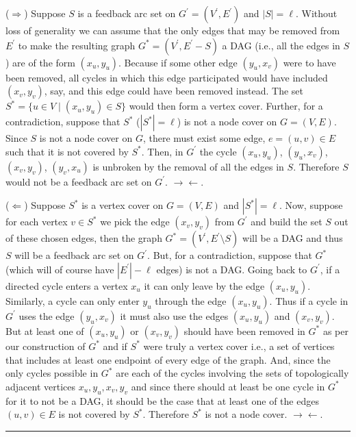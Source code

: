 \documentclass{article}
\newenvironment{proof}{{\bf Proof:}}{\hfill\rule{2mm}{2mm}}
\begin{document}
\begin{proof}

($\Rightarrow$) Suppose $S$ is a feedback arc set on $G^\prime = (V^\prime,E^\prime)$ and $|S|=\ell$. Without loss of generality we can assume
that the only edges that may be removed from $E^\prime$ to make the resulting graph $G^* = (V^\prime,E^\prime-S)$ a DAG (i.e., all the edges in $S$) are of the form $(x_u, y_u)$. Because if some other edge $(y_u, x_v)$ were to have been removed, all cycles in which this edge participated would have included $(x_v,y_v)$, say, and this edge could have been removed instead. The set $S^* = \{u \in V\;|\;(x_u,y_u) \in S\}$ would then form a vertex cover. Further, for a contradiction, suppose that $S^*$ ($|S^*|=\ell$) is not a node cover on $G = (V,E)$. Since $S$ is not a node cover on $G$, there must exist some edge, $e=(u,v)\in E$ such that it is not covered by $S^*$. Then, in $G^\prime$ the cycle $(x_u, y_u)$, $(y_u, x_v)$, $(x_v, y_v)$, $(y_v, x_u)$ is unbroken
by the removal of all the edges in $S$. Therefore $S$ would not be a feedback arc set on $G^\prime$. $\rightarrow \leftarrow$.

($\Leftarrow$) Suppose $S^*$ is a vertex cover on $G = (V,E)$ and $|S^*|=\ell$. Now, suppose for each vertex $v\in S^*$ we pick the edge $(x_v,y_v)$ from $G^\prime$ and build the set $S$ out of these chosen edges, then the graph $G^* = (V^\prime,E^\prime \setminus S)$ will be a DAG and thus $S$ will be a feedback arc set on $G^\prime$. But, for a contradiction, suppose that $G^*$ (which will of course have $|E^\prime| - \ell$ edges) is not a DAG. Going back to $G^\prime$, if a directed cycle enters a vertex $x_u$ it can only leave by the edge $(x_u, y_u)$. Similarly, a cycle can only enter $y_u$ through the edge $(x_u, y_u)$. Thus if a cycle in $G^\prime$ uses the edge $(y_u, x_v)$ it must also use the edges $(x_u, y_u)$ and $(x_v, y_v)$. But at least one of $(x_u, y_u)$ or $(x_v, y_v)$ should have been removed in $G^*$ as per our construction of $G^*$ and if $S^*$ were truly a vertex cover i.e., a set of vertices that includes at least one endpoint of every edge of the graph. And, since the only cycles possible in $G^*$ are each of the cycles involving the sets of topologically adjacent vertices $x_u, y_u, x_v, y_v$ and since there should at least be one cycle in $G^*$ for it to not be a DAG, it should be the case that at least one of the edges $(u,v) \in E$ is not covered by $S^*$. Therefore $S^*$ is not a node cover. $\rightarrow \leftarrow$. 
\end{proof}
\end{document}
